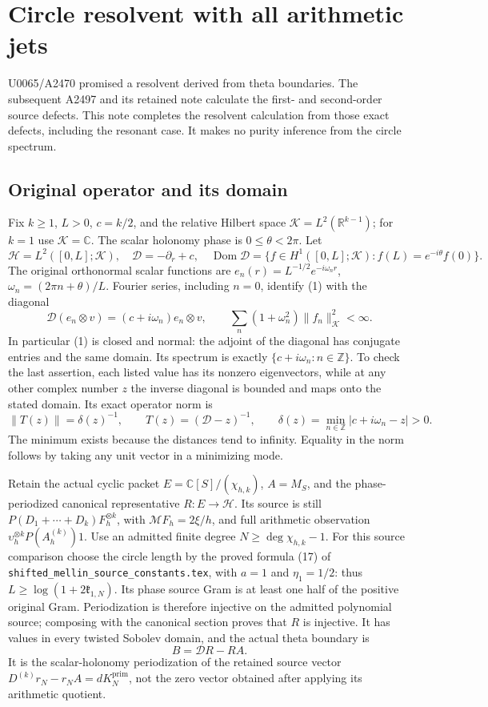 \begingroup

\section{Circle resolvent with all arithmetic jets}
U0065/A2470 promised a resolvent derived from theta boundaries. The
subsequent A2497 and its retained note calculate the first- and
second-order source defects. This note completes the resolvent
calculation from those exact defects, including the resonant case.
It makes no purity inference from the circle spectrum.

\subsection{Original operator and its domain}
Fix \(k\ge1\), \(L>0\), \(c=k/2\), and the relative Hilbert space
\(\mathcal K=L^2(\mathbb R^{k-1})\); for \(k=1\) use
\(\mathcal K=\mathbb C\). The scalar holonomy phase is
\(0\le\theta<2\pi\). Let
\[
 \mathscr H=L^2([0,L];\mathcal K),\quad
 \mathscr D=-\partial_r+c,\quad
 \operatorname{Dom}\mathscr D=
 \{f\in H^1([0,L];\mathcal K):f(L)=e^{-i\theta}f(0)\}.
 \tag{1}
\]
The original orthonormal scalar functions are
\(e_n(r)=L^{-1/2}e^{-i\omega_nr}\),
\(\omega_n=(2\pi n+\theta)/L\). Fourier series, including
\(n=0\), identify (1) with the diagonal
\[
 \mathscr D(e_n\otimes v)=(c+i\omega_n)e_n\otimes v,
 \qquad
 \sum_n(1+\omega_n^2)\|f_n\|_{\mathcal K}^2<\infty.
 \tag{2}
\]
In particular (1) is closed and normal: the adjoint of the diagonal
has conjugate entries and the same domain. Its spectrum is exactly
\(\{c+i\omega_n:n\in\mathbb Z\}\). To check the last assertion,
each listed value has its nonzero eigenvectors, while at any other
complex number \(z\) the inverse diagonal is bounded and maps onto
the stated domain. Its exact operator norm is
\[
 \|T(z)\|=\delta(z)^{-1},\qquad
 T(z)=(\mathscr D-z)^{-1},\qquad
 \delta(z)=\min_{n\in\mathbb Z}|c+i\omega_n-z|>0.
 \tag{3}
\]
The minimum exists because the distances tend to infinity. Equality
in the norm follows by taking any unit vector in a minimizing mode.

Retain the actual cyclic packet
\(E=\mathbb C[S]/(\chi_{h,k})\), \(A=M_S\), and the
phase-periodized canonical representative \(R:E\to\mathscr H\).
Its source is still
\(P(D_1+\cdots+D_k)F_h^{\otimes k}\), with
\(\mathcal MF_h=2\xi/h\), and full arithmetic observation
\(\upsilon_h^{\otimes k}P(A_h^{(k)})1\).
Use an admitted finite degree \(N\ge\deg\chi_{h,k}-1\). For this
source comparison choose the circle length by the proved formula
(17) of \texttt{shifted\_mellin\_source\_constants.tex}, with
\(a=1\) and \(\eta_1=1/2\): thus
\(L\ge\log(1+2\mathfrak k_{1,N})\). Its phase source Gram is at
least one half of the positive original Gram. Periodization is
therefore injective on the admitted polynomial source; composing
with the canonical section proves that \(R\) is injective.
It has values in every twisted Sobolev domain, and the actual theta boundary is
\[
 B=\mathscr D R-RA.
 \tag{4}
\]
It is the scalar-holonomy periodization of the retained source vector
\(D^{(k)}r_N-r_NA=dK_N^{\mathrm{prim}}\), not the zero vector
obtained after applying its arithmetic quotient.

